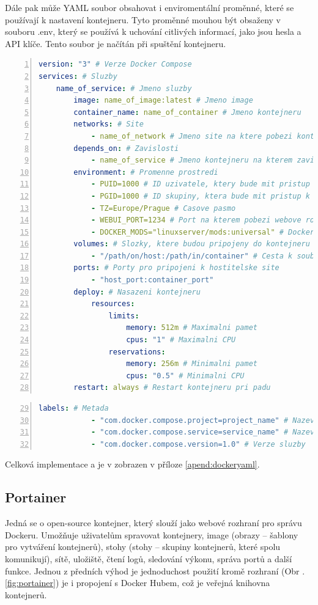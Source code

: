 Dále pak může YAML soubor obsahovat i enviromentální proměnné, které se používají k nastavení kontejneru. Tyto proměnné mouhou být obsaženy v souboru .env, který se používá k uchování citlivých informací, jako jsou hesla a API klíče. Tento soubor je načítán při spuštění kontejneru. \cite{ENV}
\begin{lstlisting}[language=YAML, breaklines=true, numbers=left, numberstyle=\small, numbersep=10pt, frame=single, basicstyle=\ttfamily\small, caption=YAML soubor, label=lst:dockeryaml]
version: "3" # Verze Docker Compose
services: # Sluzby
    name_of_service: # Jmeno sluzby
        image: name_of_image:latest # Jmeno image
        container_name: name_of_container # Jmeno kontejneru
        networks: # Site
            - name_of_network # Jmeno site na ktere pobezi kontejner
        depends_on: # Zavislosti
            - name_of_service # Jmeno kontejneru na kterem zavisi
        environment: # Promenne prostredi
            - PUID=1000 # ID uzivatele, ktery bude mit pristup k souborum
            - PGID=1000 # ID skupiny, ktera bude mit pristup k souborum
            - TZ=Europe/Prague # Casove pasmo
            - WEBUI_PORT=1234 # Port na kterem pobezi webove rozhrani 
            - DOCKER_MODS="linuxserver/mods:universal" # Docker modifikace
        volumes: # Slozky, ktere budou pripojeny do kontejneru
            - "/path/on/host:/path/in/container" # Cesta k souborum
        ports: # Porty pro pripojeni k hostitelske site
            - "host_port:container_port"
        deploy: # Nasazeni kontejneru
            resources:
                limits:
                    memory: 512m # Maximalni pamet
                    cpus: "1" # Maximalni CPU
                reservations:
                    memory: 256m # Minimalni pamet
                    cpus: "0.5" # Minimalni CPU
        restart: always # Restart kontejneru pri padu
\end{lstlisting}
\pagebreak
\begin{lstlisting}[language=YAML, breaklines=true, numbers=left, firstnumber=29, numberstyle=\small, numbersep=10pt, frame=single, basicstyle=\ttfamily\small]
        labels: # Metada
            - "com.docker.compose.project=project_name" # Nazev projektu
            - "com.docker.compose.service=service_name" # Nazev sluzby
            - "com.docker.compose.version=1.0" # Verze sluzby
\end{lstlisting}
\noindent Celková implementace a je v zobrazen v příloze \ref{apend:dockeryaml}.
\subsection{Portainer}
Jedná se o open-source kontejner, který slouží jako webové rozhraní pro správu Dockeru. Umožňuje uživatelům spravovat kontejnery, image (obrazy -- šablony pro vytváření kontejnerů), 
stohy (stohy -- skupiny kontejnerů, které spolu komunikují), sítě, uložiště, čtení logů, sledování výkonu, správa portů a další funkce. Jednou z předních výhod je jednoduchost použití kromě rozhraní (Obr . \ref{fig:portainer}) je i propojení s Docker Hubem, což je veřejná knihovna kontejnerů. \cite{Portainer} 

